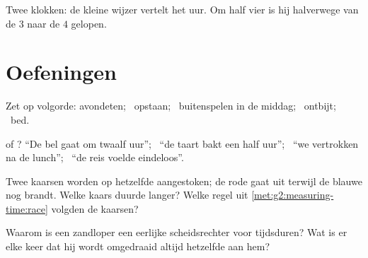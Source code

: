 \begin{omfigure}

{\small Twee klokken: de kleine wijzer vertelt het uur. Om half vier
is hij halverwege van de $3$ naar de $4$ gelopen.}
\end{omfigure}

\section{Oefeningen}

\begin{exercise}[$\star$]\label{exo:g2:measuring-time:1}
Zet op volgorde: avondeten; \ opstaan; \ buitenspelen in de middag; \
ontbijt; \ bed.
\end{exercise}

\begin{exercise}[$\star$]\label{exo:g2:measuring-time:2}
 of ? ``De bel gaat om twaalf uur''; \ ``de taart
bakt een half uur''; \ ``we vertrokken na de lunch''; \ ``de reis
voelde eindeloos''.
\end{exercise}

\begin{exercise}[$\star$]\label{exo:g2:measuring-time:3}
Twee kaarsen worden op hetzelfde  aangestoken; de rode gaat
uit terwijl de blauwe nog brandt. Welke kaars duurde langer? Welke
regel uit \cref{met:g2:measuring-time:race} volgden de kaarsen?
\end{exercise}

\begin{exercise}[$\star$]\label{exo:g2:measuring-time:4}
Waarom is een zandloper een eerlijke scheidsrechter voor
tijdsduren? Wat is er elke keer dat hij wordt omgedraaid altijd
hetzelfde aan hem?
\end{exercise}

